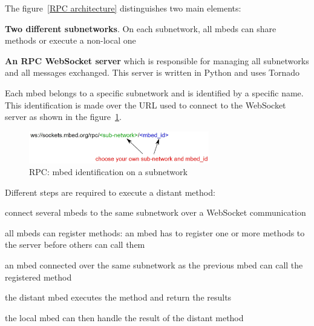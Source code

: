 \documentclass[pdftex,10pt,a4paper]{report}
\newenvironment{packed_item}{
\begin{itemize}
  \setlength{\itemsep}{1pt}
  \setlength{\parskip}{0pt}
  \setlength{\parsep}{0pt}
}{\end{itemize}}
\begin{document}
The figure~\ref{RPC architecture} distinguishes two main elements:
\begin{packed_item}
	\item \textbf{Two different subnetworks}. On each subnetwork, all mbeds can share methods or execute a non-local one
	\item \textbf{An RPC WebSocket server} which is responsible for managing all subnetworks and all messages exchanged. This server is written in Python and uses Tornado
\end{packed_item}


Each mbed belongs to a specific subnetwork and is identified by a specific name. This identification is made over the URL used to connect to the WebSocket server as shown in the figure~\ref{RPC: mbed identification on a subnetwork}. \\

\begin{figure}[h!]
		\centering
		\includegraphics[width=0.7\textwidth]{./rpc_ws.jpg}
		\caption{RPC: mbed identification on a subnetwork}
		\label{RPC: mbed identification on a subnetwork}
\end{figure}

Different steps are required to execute a distant method:
\begin{packed_item}
	\item connect several mbeds to the same subnetwork over a WebSocket communication
	\item all mbeds can register methods: an mbed has to register one or more methods to the server before others can call them
	\item an mbed connected over the same subnetwork as the previous mbed can call the registered method
	\item the distant mbed executes the method and return the results
	\item the local mbed can then handle the result of the distant method
\end{packed_item}
\end{document}
